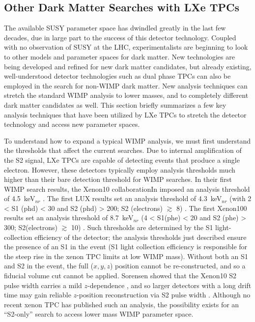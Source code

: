 \subsection{Other Dark Matter Searches with LXe TPCs}
\label{sec:non_wimp_searches_with_lxetpcs}
The available \ac{SUSY} parameter space has dwindled greatly in the last few decades, due in large part to the success of this detector technology. Coupled with no observation of \ac{SUSY} at the \ac{LHC}, experimentalists are beginning to look to other models and parameter spaces for dark matter. New technologies are being developed and refined for new dark matter candidates, but already existing, well-understood detector technologies such as dual phase \ac{TPC}s can also be employed in the search for non-\ac{WIMP} dark matter. New analysis techniques can stretch the standard \ac{WIMP} analysis to lower masses, and to completely different dark matter candidates as well. This section briefly summarizes a few key analysis techniques that have been utilized by \ac{LXe} \ac{TPC}s to stretch the detector technology and access new parameter spaces. 

To understand how to expand a typical \ac{WIMP} analysis, we must first understand the thresholds that affect the current searches. Due to internal amplification of the S2 signal, \ac{LXe} \ac{TPC}s are capable of detecting events that produce a single electron. However, these detectors typically employ analysis thresholds much higher than their bare detection threshold for \ac{WIMP} searches. In their first \ac{WIMP} search results, the Xenon10 collaborationIn imposed an analysis threshold of 4.5~keV$_{nr}$ \cite{Xenon10WIMP}. The first \ac{LUX} results set an analysis threshold of 4.3~keV$_{nr}$ (with 2 < S1 (phd) < 30 and S2 (phd) > 200; S2 (electrons) $\gtrsim$ 8) \cite{LUXFirstResults}. The first Xenon100 results set an analysis threshold of 8.7~keV$_{nr}$ (4 < S1(phe) < 20 and S2 (phe) > 300; S2(electrons) $\gtrsim$ 10) \cite{Xenon100FirstResults}. Such thresholds are determined by the S1 light-collection efficiency of the detector; the analysis thresholds just described ensure the presence of an S1 in the event (S1 light collection efficiency is responsible for the steep rise in the xenon \ac{TPC} limits at low \ac{WIMP} mass). Without both an S1 and S2 in the event, the full ($x,y,z$) position cannot be re-constructed, and so a fiducial volume cut cannot be applied. Sorensen showed that the Xenon10 S2 pulse width carries a mild $z$-dependence \cite{Sorensen2010}, and so larger detectors with a long drift time may gain reliable $z$-position reconstruction via S2 pulse width \cite{SorensenS2Width}. Although no recent xenon \ac{TPC} has published such an analysis, the possibility exists for an ``S2-only'' search to access lower mass \ac{WIMP} parameter space. %

